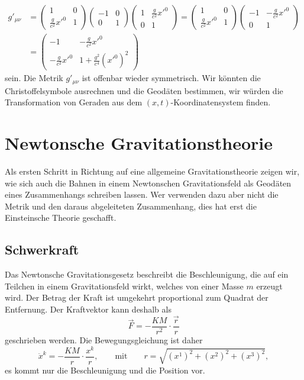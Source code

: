 \begin{align*}
g'_{\mu\nu}
&=
\begin{pmatrix}
1&0\\
\frac{g}{c^2}x'^0&1
\end{pmatrix}
\begin{pmatrix}
-1&0\\0&1
\end{pmatrix}
\begin{pmatrix}
1&\frac{g}{c^2}x'^0\\
0&1
\end{pmatrix}
=
\begin{pmatrix}
1&0\\
\frac{g}{c^2}x'^0&1
\end{pmatrix}
\begin{pmatrix}
-1&-\frac{g}{c^2}x'^0\\
 0& 1
\end{pmatrix}
\\
&=
\begin{pmatrix}
-1&-\frac{g}{c^2}x'^0\\
-\frac{g}{c^2}x'^0&1+\frac{g^2}{c^4}(x'^0)^2
\end{pmatrix}
\end{align*}
sein.
Die Metrik $g'_{\mu\nu}$ ist offenbar wieder symmetrisch.
Wir könnten die Christoffelsymbole ausrechnen und die Geodäten
bestimmen, wir würden die Transformation von Geraden aus dem
$(x,t)$-Koordinaten\-system finden.

\section{Newtonsche Gravitationstheorie%
\label{skript:section:newtonschegravitationstheorie}}
Als ersten Schritt in Richtung auf eine allgemeine Gravitationstheorie
zeigen wir, wie sich auch die Bahnen in einem Newtonschen Gravitationsfeld 
als Geodäten eines Zusammenhangs schreiben lassen.
Wer verwenden dazu aber nicht die Metrik und den daraus abgeleiteten 
Zusammenhang, dies hat erst die Einsteinsche Theorie geschafft.

\subsection{Schwerkraft%
\label{skript:section:schwerkraft}}
Das Newtonsche Gravitationsgesetz beschreibt die Beschleunigung, die
auf ein Teilchen in einem Gravitationsfeld wirkt, welches von einer
Masse $m$ erzeugt wird.
Der Betrag der Kraft ist umgekehrt proportional zum Quadrat der
Entfernung.
Der Kraftvektor kann deshalb als
\begin{equation}
\vec F = -\frac{KM}{r^2}\cdot\frac{\vec r}{r}
\label{skript:gravitation:gkraft}
\end{equation}
geschrieben werden.
Die Bewegungsgleichung ist daher 
\begin{equation}
\ddot x^k = -\frac{KM}{r}\cdot\frac{x^k}{r},
\qquad\text{mit}\qquad r = \sqrt{(x^1)^2+(x^2)^2+(x^3)^2},
\label{skript:gravitation:bewegungsgleichung}
\end{equation}
es kommt nur die Beschleunigung und die Position vor.

